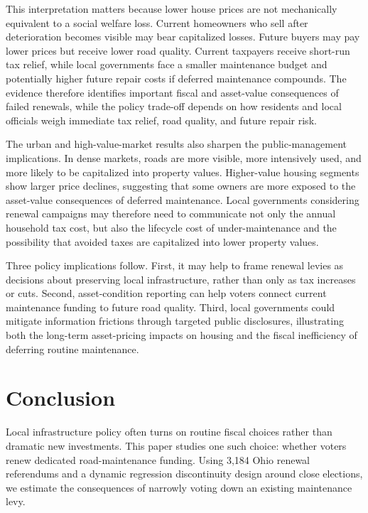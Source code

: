 This interpretation matters because lower house prices are not mechanically equivalent to a social welfare loss. Current homeowners who sell after deterioration becomes visible may bear capitalized losses. Future buyers may pay lower prices but receive lower road quality. Current taxpayers receive short-run tax relief, while local governments face a smaller maintenance budget and potentially higher future repair costs if deferred maintenance compounds. The evidence therefore identifies important fiscal and asset-value consequences of failed renewals, while the policy trade-off depends on how residents and local officials weigh immediate tax relief, road quality, and future repair risk.

The urban and high-value-market results also sharpen the public-management implications. In dense markets, roads are more visible, more intensively used, and more likely to be capitalized into property values. Higher-value housing segments show larger price declines, suggesting that some owners are more exposed to the asset-value consequences of deferred maintenance. Local governments considering renewal campaigns may therefore need to communicate not only the annual household tax cost, but also the lifecycle cost of under-maintenance and the possibility that avoided taxes are capitalized into lower property values.

Three policy implications follow. First, it may help to frame renewal levies as decisions about preserving local infrastructure, rather than only as tax increases or cuts. Second, asset-condition reporting can help voters connect current maintenance funding to future road quality.
Third, local governments could mitigate information frictions through targeted public disclosures, illustrating both the long-term asset-pricing impacts on housing and the fiscal inefficiency of deferring routine maintenance.









\section{Conclusion} \label{sec:conclusion}

Local infrastructure policy often turns on routine fiscal choices rather than dramatic new investments. This paper studies one such choice: whether voters renew dedicated road-maintenance funding. Using 3,184 Ohio renewal referendums and a dynamic regression discontinuity design around close elections, we estimate the consequences of narrowly voting down an existing maintenance levy.

